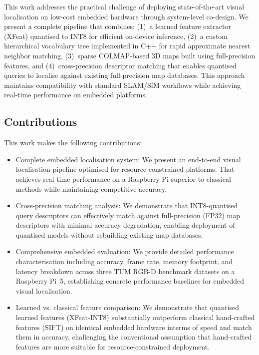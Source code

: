 \documentclass[12pt]{article}
\begin{document}
This work addresses the practical challenge of deploying state-of-the-art visual localisation on low-cost embedded hardware through system-level co-design. We present a complete pipeline that combines: (1)~a learned feature extractor (XFeat) quantised to INT8 for efficient on-device inference, (2)~a custom hierarchical vocabulary tree implemented in C++ for rapid approximate nearest neighbor matching, (3)~sparse COLMAP-based 3D maps built using full-precision features, and (4)~cross-precision descriptor matching that enables quantised queries to localise against existing full-precision map databases. This approach maintains compatibility with standard SLAM/SfM workflows while achieving real-time performance on embedded platforms.

\subsection{Contributions}

This work makes the following contributions:

\begin{itemize}
\item Complete embedded localisation system: We present an end-to-end visual localisation pipeline optimised for resource-constrained platforms. That achieves real-time performance on a Raspberry Pi superior to classical methods while maintaining competitive accuracy.

\item Cross-precision matching analysis: We demonstrate that INT8-quantised query descriptors can effectively match against full-precision (FP32) map descriptors with minimal accuracy degradation, enabling deployment of quantised models without rebuilding existing map databases.


\item Comprehensive embedded evaluation: We provide detailed performance characterisation including accuracy, frame rate, memory footprint, and latency breakdown across three TUM RGB-D benchmark datasets on a Raspberry Pi~5, establishing concrete performance baselines for embedded visual localisation.

\item Learned vs. classical feature comparison: We demonstrate that quantised learned features (XFeat-INT8) substantially outperform classical hand-crafted features (SIFT) on identical embedded hardware interms of speed and match them in accuracy, challenging the conventional assumption that hand-crafted features are more suitable for resource-constrained deployment.
\end{itemize}
\end{document}
